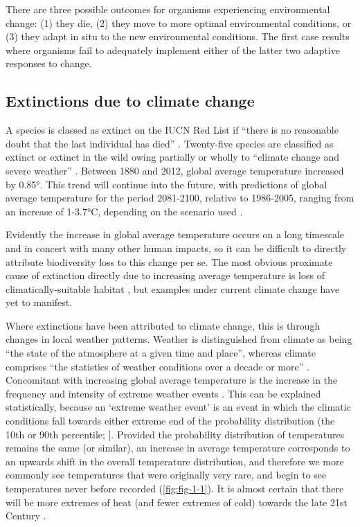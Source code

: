 \documentclass[12pt,a4paper,]{report}
\theoremstyle{definition}
\theoremstyle{definition}
\theoremstyle{definition}
\theoremstyle{remark}
\begin{document}
There are three possible outcomes for organisms experiencing
environmental change: (1) they die, (2) they move to more optimal
environmental conditions, or (3) they adapt in situ to the new
environmental conditions. The first case results where organisms fail to
adequately implement either of the latter two adaptive responses to
change.

\subsection{Extinctions due to climate
change}\label{extinctions-due-to-climate-change}

A species is classed as extinct on the IUCN Red List if ``there is no
reasonable doubt that the last individual has died''
\citep{baillie_2004_2004}. Twenty-five species are classified as extinct
or extinct in the wild owing partially or wholly to ``climate change and
severe weather'' \citep{baillie_2004_2004}. Between 1880 and 2012,
global average temperature increased by 0.85°. This trend will continue
into the future, with predictions of global average temperature for the
period 2081-2100, relative to 1986-2005, ranging from an increase of
1-3.7°C, depending on the scenario used \citep{ipcc_climate_2013}.

Evidently the increase in global average temperature occurs on a long
timescale and in concert with many other human impacts, so it can be
difficult to directly attribute biodiversity loss to this change per se.
The most obvious proximate cause of extinction directly due to
increasing average temperature is loss of climatically-suitable habitat
\citep{thomas_extinction_2004}, but examples under current climate
change have yet to manifest.

Where extinctions have been attributed to climate change, this is
through changes in local weather patterns. Weather is distinguished from
climate as being ``the state of the atmosphere at a given time and
place'', whereas climate comprises ``the statistics of weather
conditions over a decade or more'' \citep{ipcc_climate_2013}.
Concomitant with increasing global average temperature is the increase
in the frequency and intensity of extreme weather events
\citep{ipcc_climate_2013}. This can be explained statistically, because
an `extreme weather event' is an event in which the climatic conditions
fall towards either extreme end of the probability distribution (the
10th or 90th percentile; \citet{ipcc_climate_2013}{]}. Provided the
probability distribution of temperatures remains the same (or similar),
an increase in average temperature corresponds to an upwards shift in
the overall temperature distribution, and therefore we more commonly see
temperatures that were originally very rare, and begin to see
temperatures never before recorded (\autoref{fig:fig-1-1}). It is almost
certain that there will be more extremes of heat (and fewer extremes of
cold) towards the late 21st Century \citep{ipcc_climate_2013}.
\end{document}
